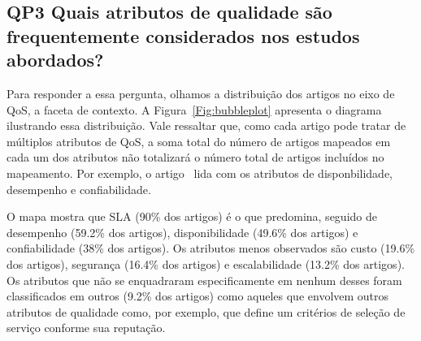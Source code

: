 \subsection{QP3 Quais atributos de qualidade são frequentemente considerados nos estudos abordados?}

Para responder a essa pergunta, olhamos a distribui\c{c}\~{a}o dos artigos no eixo de QoS, a faceta de contexto. A Figura~\ref{Fig:bubbleplot} apresenta o diagrama ilustrando essa distribui\c{c}\~{a}o. Vale ressaltar que, como cada artigo pode tratar de m\'{u}ltiplos atributos de QoS, a soma total do n\'{u}mero de artigos mapeados em cada um dos atributos n\~{a}o totalizar\'{a} o n\'{u}mero total de artigos inclu\'{i}dos no mapeamento. Por exemplo, o artigo~\cite{DBLP:journals/tse/CalinescuGKMT11} lida com os atributos de disponbilidade, desempenho e confiabilidade. 

O mapa mostra que SLA (90\% dos artigos) \'{e} o que predomina, seguido de desempenho (59.2\% dos artigos), disponibilidade (49.6\% dos artigos) e confiabilidade (38\% dos artigos). Os atributos menos observados s\~{a}o custo (19.6\% dos artigos), seguran\c{c}a (16.4\% dos artigos) e escalabilidade (13.2\% dos artigos). Os atributos que n\~{a}o se enquadraram especificamente em nenhum desses foram classificados em outros (9.2\% dos artigos) como aqueles que envolvem outros atributos de qualidade como, por exemplo, \cite{6036406} que define um crit\'{e}rios de sele\c{c}\~{a}o de servi\c{c}o conforme sua reputa\c{c}\~{a}o. 